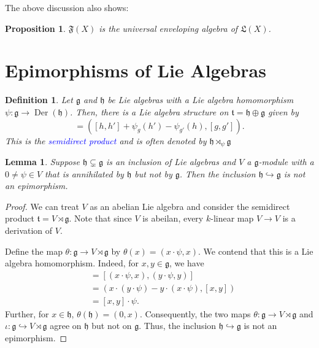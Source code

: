 \documentclass[12pt]{article}
\theoremstyle{thmstyle}
\newtheorem{lemma}[theorem]{Lemma}
\newtheorem{proposition}[theorem]{Proposition}
\theoremstyle{defstyle}
\newtheorem{definition}[theorem]{Definition}
\newcommand{\frakF}{\mathfrak{F}}
\newcommand{\frakg}{\mathfrak{g}}
\newcommand{\frakh}{\mathfrak{h}}
\newcommand{\frakt}{\mathfrak{t}}
\newcommand{\frakL}{\mathfrak{L}}
\newcommand{\into}{\hookrightarrow}
\newcommand{\define}[1]{\textcolor{blue}{\textit{#1}}}
\begin{document}
The above discussion also shows: 
\begin{proposition}
    $\frakF(X)$ is the universal enveloping algebra of $\frakL(X)$.
\end{proposition}

\section{Epimorphisms of Lie Algebras}

\begin{definition}
    Let $\frakg$ and $\frakh$ be Lie algebras with a Lie algebra homomorphism $\psi:\frakg\to\operatorname{Der}(\frakh)$. Then, there is a Lie algebra structure on $\frakt = \frakh\oplus\frakg$ given by 
    \begin{equation*}
        [(h, g), (h', g')] = \left([h, h'] + \psi_g(h') - \psi_{g'}(h), [g, g']\right).
    \end{equation*}
    This is the \define{semidirect product} and is often denoted by $\frakh\rtimes_{\psi}\frakg$
\end{definition}

\begin{lemma}
    Suppose $\frakh\subsetneq\frakg$ is an inclusion of Lie algebras and $V$ a $\frakg$-module with a $0\ne\psi\in V$ that is annihilated by $\frakh$ but not by $\frakg$. Then the inclusion $\frakh\into\frakg$ is not an epimorphism.
\end{lemma}
\begin{proof}
    We can treat $V$ as an abelian Lie algebra and consider the semidirect product $\frakt = V\rtimes\frakg$. Note that since $V$ is abeilan, every $k$-linear map $V\to V$ is a derivation of $V$. 

    Define the map $\theta: \frakg\to V\rtimes\frakg$ by $\theta(x) = (x\cdot\psi, x)$. We contend that this is a Lie algebra homomorphism. Indeed, for $x,y\in\frakg$, we have 
    \begin{align*}
        [\theta(x), \theta(y)] &= \left[(x\cdot\psi, x), (y\cdot\psi, y)\right]\\
        &= \left(x\cdot(y\cdot\psi) - y\cdot(x\cdot\psi), [x, y]\right)\\
        &= [x, y]\cdot\psi.
    \end{align*}
     Further, for $x\in\frakh$, $\theta(\frakh) = (0, x)$. Consequently, the two maps $\theta:\frakg\to V\rtimes\frakg$ and $\iota:\frakg\into V\rtimes\frakg$ agree on $\frakh$ but not on $\frakg$. Thus, the inclusion $\frakh\into\frakg$ is not an epimorphism.
\end{proof}
\end{document}
